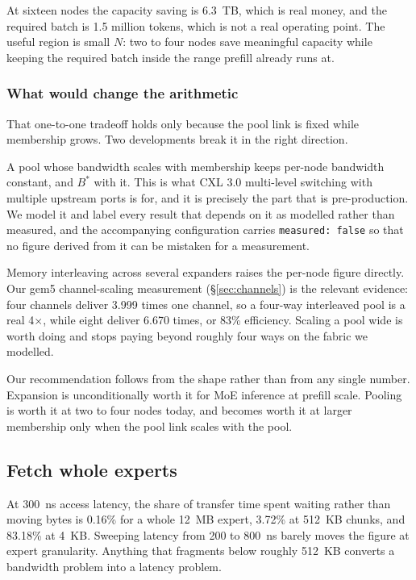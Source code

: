 \documentclass[10pt,a4paper]{article}
\begin{document}
At sixteen nodes the capacity saving is 6.3~TB, which is real money, and the
required batch is 1.5 million tokens, which is not a real operating point. The
useful region is small $N$: two to four nodes save meaningful capacity while
keeping the required batch inside the range prefill already runs at.

\subsubsection*{What would change the arithmetic}

That one-to-one tradeoff holds only because the pool link is fixed while
membership grows. Two developments break it in the right direction.

A pool whose bandwidth scales with membership keeps per-node bandwidth constant,
and $B^{*}$ with it. This is what CXL 3.0 multi-level switching with multiple
upstream ports is for, and it is precisely the part that is pre-production. We
model it and label every result that depends on it as modelled rather than
measured, and the accompanying configuration carries \texttt{measured: false} so
that no figure derived from it can be mistaken for a measurement.

Memory interleaving across several expanders raises the per-node figure directly.
Our gem5 channel-scaling measurement (\S\ref{sec:channels}) is the relevant
evidence: four channels deliver 3.999 times one channel, so a four-way
interleaved pool is a real 4$\times$, while eight deliver 6.670 times, or 83\%
efficiency. Scaling a pool wide is worth doing and stops paying beyond roughly
four ways on the fabric we modelled.

Our recommendation follows from the shape rather than from any single
number. Expansion is unconditionally worth it for MoE inference at prefill scale.
Pooling is worth it at two to four nodes today, and becomes worth it at larger
membership only when the pool link scales with the pool.

\subsection{Fetch whole experts}
\label{sec:granularity}

At 300~ns access latency, the share of transfer time spent waiting rather than
moving bytes is 0.16\% for a whole 12~MB expert, 3.72\% at 512~KB chunks, and
83.18\% at 4~KB. Sweeping latency from 200 to 800~ns barely moves the figure at
expert granularity. Anything that fragments below roughly 512~KB converts a
bandwidth problem into a latency problem.
\end{document}
